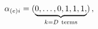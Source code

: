 \begin{equation}
\label{KMel}
 \alpha_{(e) i}= (\underbrace {0,\dots,0, 1, 1,1, }_{k=D \rm~ terms})\, ,
\end{equation} 
